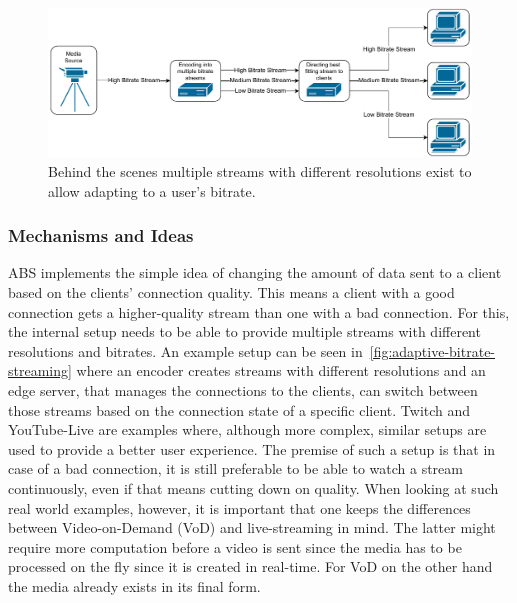 \vspace{0.5cm}
\begin{figure}[htbp] %
    \centering
    \includegraphics[width=\textwidth]{figures/02_background/adaptive-bitrate-streaming.drawio.pdf}
    \caption[Adaptive streaming schematic]{Behind the scenes multiple streams with different
    resolutions exist to allow adapting to a user's bitrate.}\label{fig:adaptive-bitrate-streaming}
\end{figure}
\vspace{1cm}

\subsubsection{Mechanisms and Ideas}
ABS implements the simple idea of changing the amount of data sent to a client 
based on the clients' connection quality.
This means a client with a good connection gets a higher-quality stream than 
one with a bad connection.
For this, the internal setup needs to be able to provide multiple streams with
different resolutions and bitrates.
An example setup can be seen in~\autoref{fig:adaptive-bitrate-streaming} where
an encoder creates streams with different resolutions and an edge server, that 
manages the connections to the clients, can switch between those streams based on
the connection state of a specific client.
Twitch and YouTube-Live are examples where, although more complex, similar setups
are used to provide a better user experience.
The premise of such a setup is that in case of a bad connection, it is still 
preferable to be able to watch a stream continuously, even if that means
cutting down on quality.
When looking at such real world examples, however, it is important that one keeps 
the differences between Video-on-Demand (VoD) and live-streaming in mind.
The latter might require more computation before a video is sent since the media 
has to be processed on the fly since it is created in real-time.
For VoD on the other hand the media already exists in its final form. 

